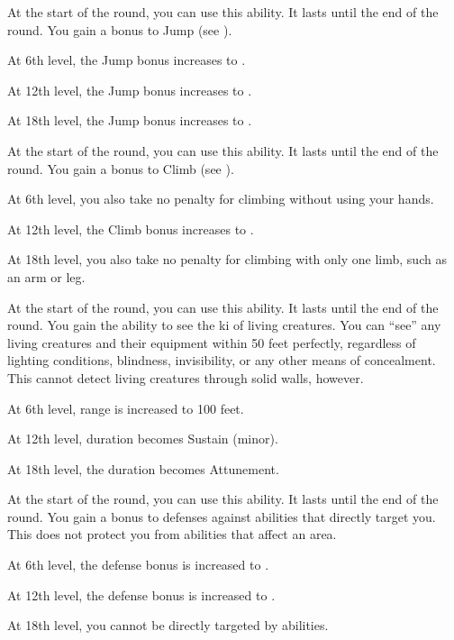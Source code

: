 {            
            At the start of the round, you can use this ability.
            It lasts until the end of the round.
            You gain a  bonus to Jump (see ).
            \par At 6th level, the Jump bonus increases to .
            \par At 12th level, the Jump bonus increases to .
            \par At 18th level, the Jump bonus increases to .

            At the start of the round, you can use this ability.
            It lasts until the end of the round.
            You gain a  bonus to Climb (see ).
            \par At 6th level, you also take no penalty for climbing without using your hands.
            \par At 12th level, the Climb bonus increases to .
            \par At 18th level, you also take no penalty for climbing with only one limb, such as an arm or leg.

            At the start of the round, you can use this ability.
            It lasts until the end of the round.
            You gain the ability to see the ki of living creatures.
            You can ``see'' any living creatures and their equipment within 50 feet perfectly, regardless of lighting conditions, blindness, invisibility, or any other means of concealment.
            This cannot detect living creatures through solid walls, however.
            \par At 6th level, range is increased to 100 feet.
            \par At 12th level, duration becomes Sustain (minor).
            \par At 18th level, the duration becomes Attunement.

            At the start of the round, you can use this ability.
            It lasts until the end of the round.
            You gain a  bonus to defenses against  abilities that directly target you.
            This does not protect you from abilities that affect an area.
            \par At 6th level, the defense bonus is increased to .
            \par At 12th level, the defense bonus is increased to .
            \par At 18th level, you cannot be directly targeted by  abilities.

}
